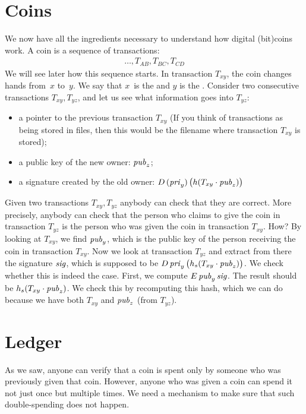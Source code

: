 \section{Coins}\label{sec:bitcoin-coin}

We now have all the ingredients necessary to understand how digital (bit)coins work.
A coin is a sequence of transactions:
\begin{align*}
  \ldots,
  T_{AB},
  T_{BC},
  T_{CD}
\end{align*}
We will see later how this sequence starts.
In transaction $T_{xy}$, the coin changes hands from~$x$ to~$y$.
We say that $x$~is the  and $y$ is the .
Consider two consecutive transactions $T_{xy},T_{yz}$, and let us see what information goes into $T_{yz}$:
\begin{itemize}
\item a pointer to the previous transaction $T_{xy}$
  (If you think of transactions as being stored in files, then this would be the filename where transaction $T_{xy}$ is stored);
\item a public key of the new owner: ${\it pub}_z$;
\item a signature created by the old owner:
  $D\,({\it pri}_y)\,\bigl(h(T_{xy}\cdot{\it pub}_z)\bigr)$
\end{itemize}

Given two transactions $T_{xy},T_{yz}$ anybody can check that they are correct.
More precisely, anybody can check that the person who claims to give the coin in transaction $T_{yz}$ is the person who was given the coin in transaction $T_{xy}$.
How?
By looking at $T_{xy}$, we find ${\it pub}_y$, which is the public key of the person receiving the coin in transaction $T_{xy}$.
Now we look at transaction $T_{yz}$ and extract from there the signature ${\it sig}$, which is supposed to be $D\,{\it pri}_y\,\bigl(h_s(T_{xy}\cdot{\it pub}_z)\bigr)$.
We check whether this is indeed the case.
First, we compute $E\,{\it pub}_y\,{\it sig}$.
The result should be $h_s(T_{xy}\cdot{\it pub}_z)$.
We check this by recomputing this hash, which we can do because we have both $T_{xy}$ and ${\it pub}_z$ (from $T_{yz}$).


\section{Ledger}\label{sec:bitcoin-ledger}

As we saw, anyone can verify that a coin is spent only by someone who was previously given that coin.
However, anyone who was given a coin can spend it not just once but multiple times.
We need a mechanism to make sure that such double-spending does not happen.


